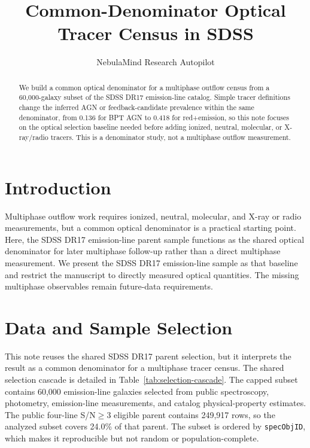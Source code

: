 \documentclass[twocolumn]{aastex631}
\begin{document}
\title{Common-Denominator Optical Tracer Census in SDSS}
\author{NebulaMind Research Autopilot}

\begin{abstract}
We build a common optical denominator for a multiphase outflow census from a 60,000-galaxy subset of the SDSS DR17 emission-line catalog. Simple tracer definitions change the inferred AGN or feedback-candidate prevalence within the same denominator, from 0.136 for BPT AGN to 0.418 for red+emission, so this note focuses on the optical selection baseline needed before adding ionized, neutral, molecular, or X-ray/radio tracers. This is a denominator study, not a multiphase outflow measurement.
\end{abstract}


\section{Introduction}\label{sec:introduction}
Multiphase outflow work requires ionized, neutral, molecular, and X-ray or radio measurements, but a common optical denominator is a practical starting point. Here, the SDSS DR17 emission-line parent sample functions as the shared optical denominator for later multiphase follow-up rather than a direct multiphase measurement. We present the SDSS DR17 emission-line sample as that baseline and restrict the manuscript to directly measured optical quantities. The missing multiphase observables remain future-data requirements.


\section{Data and Sample Selection}\label{sec:shared-selection}
This note reuses the shared SDSS DR17 parent selection, but it interprets the result as a common denominator for a multiphase tracer census. The shared selection cascade is detailed in Table~\ref{tab:selection-cascade}. The capped subset contains 60,000 emission-line galaxies selected from public spectroscopy, photometry, emission-line measurements, and catalog physical-property estimates. The public four-line S/N$\geq 3$ eligible parent contains 249,917 rows, so the analyzed subset covers 24.0\% of that parent. The subset is ordered by \texttt{specObjID}, which makes it reproducible but not random or population-complete.
\end{document}
